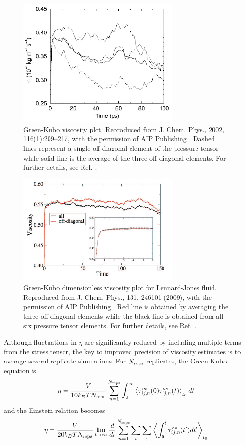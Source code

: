 \documentclass[9pt,bestpractices]{livecoms}
\begin{document}
\begin{figure}[htb!]
	\centering
	\includegraphics[width=3.2in]{HessFig5.png}
	\caption{Green-Kubo viscosity plot. Reproduced from J. Chem. Phys., 2002, 116(1):209--217, with the permission of AIP Publishing \cite{Hess2002}. Dashed lines represent a single off-diagonal element of the pressure tensor while solid line is the average of the three off-diagonal elements. For further details, see Ref. \cite{Hess2002}.}
	\label{fig:HessFig5}
\end{figure}

\begin{figure}[htb!]
	\centering
	\includegraphics[width=3.2in]{ChenFig1.png}
	\caption{Green-Kubo dimensionless viscosity plot for Lennard-Jones fluid. Reproduced from J. Chem. Phys., 131, 246101 (2009), with the permission of AIP Publishing \cite{Chen2009}. Red line is obtained by averaging the three off-diagonal elements while the black line is obtained from all six pressure tensor elements. For further details, see Ref. \cite{Chen2009}.}
	\label{fig:ChenFig1}
\end{figure}

Although fluctuations in $\eta$ are significantly reduced by including multiple terms from the stress tensor, the key to improved precision of viscosity estimates is to average several replicate simulations. For $N_{\rm reps}$ replicates, the Green-Kubo equation is
\begin{equation}
\eta = \frac{V}{10 k_B T N_{\rm reps}} \sum_{n=1}^{N_{\rm reps}}  \int_0^\infty \left\langle \tau_{ij,n}^{os}(0)\tau_{ij,n}^{os}(t) \right\rangle_{t_0} dt
\label{eq:GKwonder_replicates}
\end{equation}
and the Einstein relation becomes
\begin{equation}
\eta = \displaystyle \frac{V}{20 k_B T N_{\rm reps}} \lim_{t\to\infty} \frac{d}{dt} \sum_{n=1}^{N_{\rm reps}} \sum_i \sum_j \left\langle \int_0^t \tau_{ij,n}^{os}(t') dt' \right\rangle_{t_0}
\label{eq:Einwonder_replicates}
\end{equation}
\end{document}
